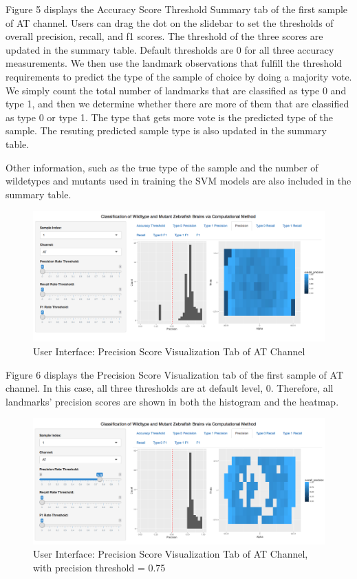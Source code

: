 \documentclass[10pt,letterpaper]{article}
\begin{document}
Figure 5 displays the Accuracy Score Threshold Summary tab of the first
sample of AT channel. Users can drag the dot on the slidebar to set the
thresholds of overall precision, recall, and f1 scores. The threshold of
the three scores are updated in the summary table. Default thresholds
are 0 for all three accuracy measurements. We then use the landmark
observations that fulfill the threshold requirements to predict the type
of the sample of choice by doing a majority vote. We simply count the
total number of landmarks that are classified as type 0 and type 1, and
then we determine whether there are more of them that are classified as
type 0 or type 1. The type that gets more vote is the predicted type of
the sample. The resuting predicted sample type is also updated in the
summary table.

Other information, such as the true type of the sample and the number of
wildetypes and mutants used in training the SVM models are also included
in the summary table.

\begin{figure}[h]

{\centering \includegraphics[width=4.92in]{figures/shiny2} 

}

\caption{User Interface: Precision Score Visualization Tab of AT Channel}\label{fig:shiny2}
\end{figure}

Figure 6 displays the Precision Score Visualization tab of the first
sample of AT channel. In this case, all three thresholds are at default
level, 0. Therefore, all landmarks' precision scores are shown in both
the histogram and the heatmap.

\begin{figure}[h]

{\centering \includegraphics[width=4.9in]{figures/shiny3} 

}

\caption{User Interface: Precision Score Visualization Tab of AT Channel, with precision threshold = 0.75}\label{fig:shiny3}
\end{figure}
\end{document}
